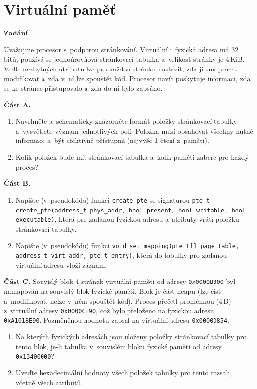 \section{Virtuální paměť}

\noindent\textbf{Zadání.}\par
Uvažujme procesor s~podporou stránkování. Virtuální i~fyzická adresa má 32 bitů, používá
se jednoúrovňová stránkovací tabulka a~velikost stránky je 4\,KiB. Vedle nezbytných atributů
lze pro každou stránku nastavit, zda ji smí proces modifikovat a~zda v~ní lze spouštět kód.
Procesor navíc poskytuje informaci, zda se ke stránce přistupovalo a~zda do ní bylo zapsáno.

\medskip
\noindent\textbf{Část A.}
\begin{enumerate}
\item Navrhněte a~schematicky znázorněte formát položky stránkovací tabulky a~vysvětlete
  význam jednotlivých polí. Položka musí obsahovat všechny nutné informace a~být efektivně
  přístupná (nejvýše 1 čtení z~paměti).
\item Kolik položek bude mít stránkovací tabulka a~kolik paměti zabere pro každý proces?
\end{enumerate}

\noindent\textbf{Část B.}
\begin{enumerate}
\item Napište (v~pseudokódu) funkci \texttt{create\_pte} se signaturou
  \texttt{pte\_t create\_pte(address\_t phys\_addr, bool present, bool writable, bool executable)},
  která pro zadanou fyzickou adresu a~atributy vrátí položku stránkovací tabulky.
\item Napište (v~pseudokódu) funkci \texttt{void set\_mapping(pte\_t[] page\_table, address\_t virt\_addr, pte\_t entry)},
  která do tabulky pro zadanou virtuální adresu vloží záznam.
\end{enumerate}

\noindent\textbf{Část C.}
Souvislý blok 4 stránek virtuální paměti od adresy \texttt{0x0000B000} byl namapován na
souvislý blok fyzické paměti. Blok je část heapu (lze číst a~modifikovat, nelze v~něm
spouštět kód). Proces přečetl proměnnou (4\,B) z~virtuální adresy \texttt{0x0000CE90}, což
bylo přeloženo na fyzickou adresu \texttt{0xA1018E90}. Pozměněnou hodnotu zapsal na
virtuální adresu \texttt{0x0000D854}.
\begin{enumerate}
\item Na kterých fyzických adresách jsou uloženy položky stránkovací tabulky pro tento blok,
  je-li tabulka v~souvislém bloku fyzické paměti od adresy \texttt{0x13400000}?
\item Uveďte hexadecimální hodnoty všech položek tabulky pro tento rozsah, včetně všech atributů.
\end{enumerate}

